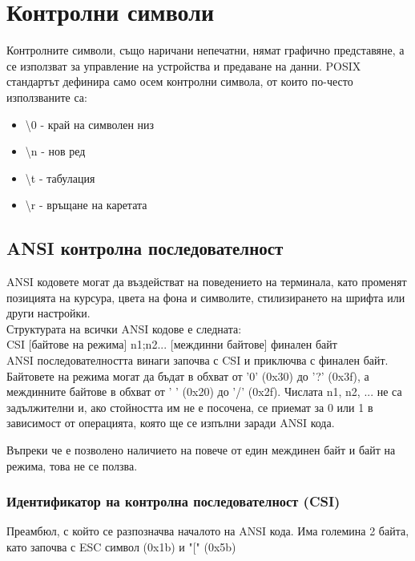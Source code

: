 \section{Контролни символи}
        Контролните символи, също наричани непечатни, нямат графично 
        представяне, а се използват за управление на устройства и предаване на 
        данни. POSIX стандартът дефинира само осем контролни символа, от които 
        по-често използваните са:
        \begin{itemize}
                \item \large \textbackslash 0 - край на символен низ 
                \item \large \textbackslash n - нов ред
                \item \large \textbackslash t - табулация
                \item \large \textbackslash r - връщане на каретата
        \end{itemize}
        \vspace{10mm}

        \subsection{ANSI контролна последователност}
                ANSI кодовете могат да въздействат на поведението на терминала,
                като променят позицията на курсура, цвета на фона и символите, 
                стилизирането на шрифта или други настройки. \\

                Структурата на всички ANSI кодове е следната: \\
                CSI [байтове на режима] n1;n2... [междинни байтове] финален
                байт \\ 

                ANSI последователността винаги започва с CSI и приключва с
                финален байт. Байтовете на режима могат да бъдат в обхват от
                '0' (0x30) до '?' (0x3f), а междинните байтове в обхват от ' '
                (0x20) до '/' (0x2f). Числата n1, n2, ... не са задължителни и,
                ако стойността им не е посочена, се приемат за 0 или 1 в 
                зависимост от операцията, която ще се изпълни заради ANSI кода. 

                Въпреки че е позволено наличието на повече от един междинен 
                байт и байт на режима, това не се ползва.


                \subsubsection{Идентификатор на контролна последователност 
                (CSI)}
                        Преамбюл, с който се разпозначва началото на ANSI кода.
                        Има големина 2 байта, като започва с ESC символ (0x1b) 
                        и "[" (0x5b) \\

